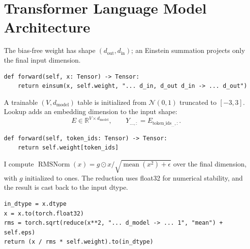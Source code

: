 \section{Transformer Language Model Architecture}



The bias-free weight has shape $(d_{\mathrm{out}}, d_{\mathrm{in}})$; an Einstein summation projects only the final input dimension.
\par\noindent
\begin{minipage}{\linewidth}
\begin{lstlisting}[caption={Linear projection}]
def forward(self, x: Tensor) -> Tensor:
    return einsum(x, self.weight, "... d_in, d_out d_in -> ... d_out")
\end{lstlisting}
\end{minipage}\par



A trainable $(V, d_{\mathrm{model}})$ table
is initialized from $\mathcal{N}(0,1)$ truncated to $[-3,3]$. Lookup adds an
embedding dimension to the input shape:
\[
E\in\mathbb{R}^{V\times d_{\mathrm{model}}},\qquad
Y_{\ldots,:}=E_{\mathrm{token\_ids}_{\ldots},:}.
\]
\par\noindent
\begin{minipage}{\linewidth}
\begin{lstlisting}[caption={Embedding lookup}]
def forward(self, token_ids: Tensor) -> Tensor:
    return self.weight[token_ids]
\end{lstlisting}
\end{minipage}\par



I compute $\operatorname{RMSNorm}(x)=g\odot x/\sqrt{\operatorname{mean}(x^2)+\epsilon}$ over the final dimension, with $g$ initialized to ones. The reduction uses float32 for numerical stability, and the result is cast back to the input dtype.
\par\noindent
\begin{minipage}{\linewidth}
\begin{lstlisting}[caption={RMSNorm forward pass}]
in_dtype = x.dtype
x = x.to(torch.float32)
rms = torch.sqrt(reduce(x**2, "... d_model -> ... 1", "mean") + self.eps)
return (x / rms * self.weight).to(in_dtype)
\end{lstlisting}
\end{minipage}\par


